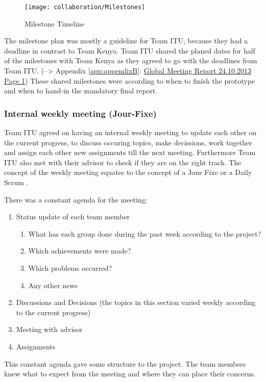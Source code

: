 	\begin{figure}[ht]
		\centering
		\texttt{[image: collaboration/Milestones]}
		\caption{Milestone Timeline}
		\label{fig:milestones}
	\end{figure}

The milestone plan was mostly a guideline for Team ITU, because they had a deadline in contrast to Team Kenya. Team ITU shared the planed dates for half of the milestones with Team Kenya as they agreed to go with the deadlines from Team ITU. (--> Appendix \ref{app:appendixB}: \hyperlink{GSD20131024.1}{Global Meeting Report 24.10.2013 Page 1}) These shared milestones were according to when to finish the prototype and when to hand-in the mandatory final report.

\subsubsection{Internal weekly meeting (Jour-Fixe)}
Team ITU agreed on having an internal weekly meeting to update each other on the current progress, to discuss occuring topics, make decissions, work together and assign each other new assignments till the next meeting. Furthermore Team ITU also met with their advisor to check if they are on the right track. The concept of the weekly meeting equates to the concept of a Jour Fixe  or a Daily Scrum .

There was a constant agenda for the meeting:

	\begin{enumerate}
		\item Status update of each team member
			\begin{enumerate}
				\item What has each group done during the past week according to the project?
				\item Which achievements were made?	
				\item Which problems occurred?
				\item Any other news
			\end{enumerate}
		\item Discussions and Decisions (the topics in this section varied weekly according to the current progress)
		\item Meeting with advisor	
		\item Assignments
	\end{enumerate}

This constant agenda gave some structure to the project. The team members knew what to expect from the meeting and where they can place their concerns.

